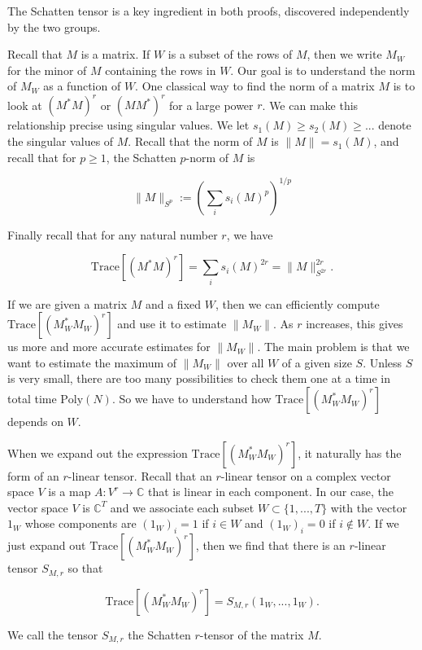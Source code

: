 \documentclass{amsart}
\newcommand{\Poly}{\textrm{Poly}}
\newcommand{\tr}{\textrm{Trace}}
\newcommand{\CC}{\mathbb{C}}
\begin{document}
The Schatten tensor is a key ingredient in both proofs, discovered independently by the two groups.

Recall that $M$ is a matrix.  If $W$ is a subset of the rows of $M$, then we write $M_W$ for the minor of $M$ containing the rows in $W$.  Our goal is to understand the norm of $M_W$ as a function of $W$.  
One classical way to find the norm of a matrix $M$ is to look at $(M^* M)^r$ or $(M M^*)^r$ for a large power $r$.   We can make this relationship precise using singular values.   
We let $s_1(M) \ge s_2(M) \ge ... $ denote the singular values of $M$.    Recall that the norm of $M$ is $\| M \| = s_1(M)$, and recall that for $p \ge 1$, the Schatten $p$-norm of $M$ is

\begin{equation} \label{defSchattp} \| M \|_{S^p} := \left( \sum_i s_i(M)^p \right)^{1/p}
\end{equation}

Finally recall that for any natural number $r$, we have

$$ \tr \left[ (M^*M)^r \right] = \sum_i s_i(M)^{2r} = \| M \|_{S^{2r}}^{2r}. $$

If we are given a matrix $M$ and a fixed $W$,  then we can efficiently compute $\tr \left[ (M_W^* M_W)^r \right]$ and use it to estimate $\| M_W \|$.    As $r$ increases,  this gives us more and more accurate estimates for $\| M_W \|$.  The main problem is that we want to estimate the maximum of $\| M_W \|$ over all $W$ of a given size $S$.
Unless $S$ is very small,  there are too many possibilities to check them one at a time in total time $\Poly(N)$.  
So we have to understand how $ \tr \left[ (M_W^* M_W)^r \right] $ depends on $W$.  

When we expand out the expression $ \tr \left[ (M_W^* M_W)^r \right] $, it naturally has the form of an $r$-linear tensor.  Recall that an $r$-linear tensor on a complex vector space $V$ is a map $A: V^r \rightarrow \CC$ that is linear in each component.  In our case, the vector space $V$ is $\CC^T$ and we associate each subset $W \subset \{1, ..., T \}$ with the vector $1_W$ whose components are $(1_W)_i = 1$ if $i \in W$ and $(1_W)_i = 0$ if $i \notin W$.   If we just expand out $  \tr \left[ (M_W^* M_W)^r \right] $,  then we find that there is an $r$-linear tensor $S_{M, r}$ so that

$$  \tr \left[ (M_W^* M_W)^r \right]  = S_{M, r}(1_W, ..., 1_W). $$

We call the tensor $S_{M, r}$ the Schatten $r$-tensor of the matrix $M$.
\end{document}
